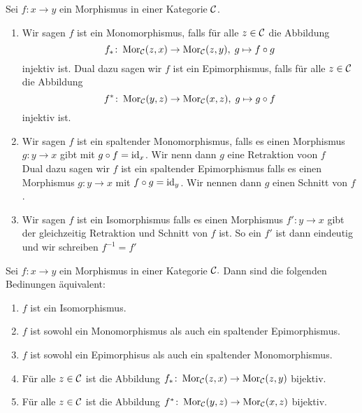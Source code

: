 \begin{Def}
    Sei \(f\colon x\to y\) ein Morphismus in einer Kategorie \(\mathcal{C}\).
    \begin{enumerate}
        \item Wir sagen \(f\) ist ein Monomorphismus, falls für alle \(z\in\mathcal{C}\) die Abbildung 
        \[f_*\colon \operatorname{Mor}_{\mathcal{C}}(z,x)\to\operatorname{Mor}_{\mathcal{C}}(z,y),\; g\mapsto f\circ g\] injektiv ist.
        Dual dazu sagen wir \(f\) ist ein Epimorphismus, falls für alle \(z\in\mathcal{C}\) die Abbildung
        \[f^*\colon\operatorname{Mor}_{\mathcal{C}}(y,z)\to\operatorname{Mor}_{\mathcal{C}}(x,z),\; g\mapsto g\circ f\] injektiv ist.
        \item Wir sagen \(f\) ist ein spaltender Monomorphismus, falls es einen Morphismus \(g\colon y\to x\) gibt mit \(g\circ f=\mathrm{id}_x\). Wir nenn dann \(g\) eine Retraktion voon \(f\)\\
        Dual dazu sagen wir \(f\) ist ein spaltender Epimorphismus falls es einen Morphismus \(g\colon y\to x\) mit \(f\circ g=\mathrm{id}_y\). Wir nennen dann \(g\) einen Schnitt von \(f\).
        \item Wir sagen \(f\) ist ein Isomorphismus falls es einen Morphismus \(f'\colon y\to x\) gibt der gleichzeitig Retraktion und Schnitt von \(f\) ist. So ein \(f'\) ist dann eindeutig und wir schreiben \(f^{-1}=f'\)
    \end{enumerate}
\end{Def}
\begin{Lemma}
    Sei \(f\colon x\to y\) ein Morphismus in einer Kategorie \(\mathcal{C}.\) Dann sind die folgenden Bedinungen äquivalent:
    \begin{enumerate}
        \item \(f\) ist ein Isomorphismus.
        \item \(f\) ist sowohl ein Monomorphismus als auch ein spaltender Epimorphismus.
        \item \(f\) ist sowohl ein Epimorphisus als auch ein spaltender Monomorphismus.
         
        \item Für alle \(z\in\mathcal{C}\) ist die Abbildung \(f_*\colon\operatorname{Mor}_{\mathcal{C}}(z,x)\to\operatorname{Mor}_{\mathcal{C}}(z,y)\) bijektiv.
        \item Für alle \(z\in\mathcal{C}\) ist die Abbildung \(f^*\colon \operatorname{Mor}_{\mathcal{C}}(y,z)\to \operatorname{Mor}_{\mathcal{C}}(x,z)\) bijektiv.
       
    \end{enumerate}
\end{Lemma}
